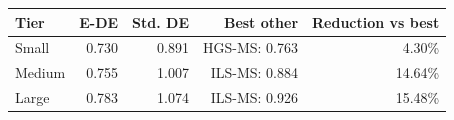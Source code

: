 \begin{tabular}{lrrrr}
\toprule
Tier & E-DE & Std. DE & Best other & Reduction vs best \\
\midrule
Small & 0.730 & 0.891 & HGS-MS: 0.763 & 4.30\% \\
Medium & 0.755 & 1.007 & ILS-MS: 0.884 & 14.64\% \\
Large & 0.783 & 1.074 & ILS-MS: 0.926 & 15.48\% \\
\bottomrule
\end{tabular}
